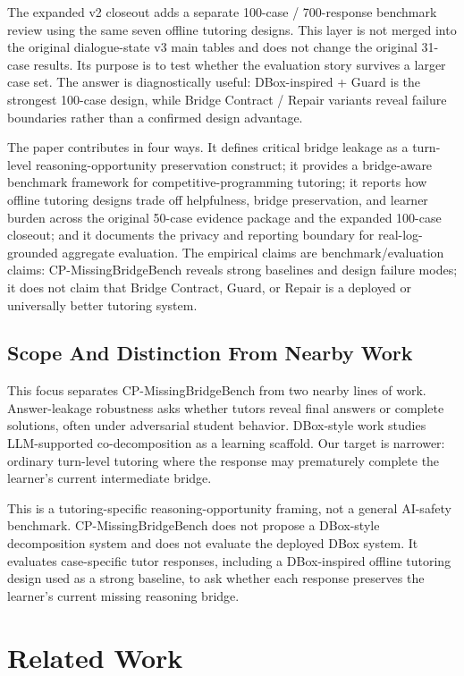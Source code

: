\documentclass[11pt]{article}
\begin{document}
The expanded v2 closeout adds a separate 100-case / 700-response benchmark review using the same seven offline tutoring designs. This layer is not merged into the original dialogue-state v3 main tables and does not change the original 31-case results. Its purpose is to test whether the evaluation story survives a larger case set. The answer is diagnostically useful: DBox-inspired + Guard is the strongest 100-case design, while Bridge Contract / Repair variants reveal failure boundaries rather than a confirmed design advantage.

The paper contributes in four ways. It defines critical bridge leakage as a turn-level reasoning-opportunity preservation construct; it provides a bridge-aware benchmark framework for competitive-programming tutoring; it reports how offline tutoring designs trade off helpfulness, bridge preservation, and learner burden across the original 50-case evidence package and the expanded 100-case closeout; and it documents the privacy and reporting boundary for real-log-grounded aggregate evaluation. The empirical claims are benchmark/evaluation claims: CP-MissingBridgeBench reveals strong baselines and design failure modes; it does not claim that Bridge Contract, Guard, or Repair is a deployed or universally better tutoring system.

\subsection{Scope And Distinction From Nearby Work}

This focus separates CP-MissingBridgeBench from two nearby lines of work. Answer-leakage robustness asks whether tutors reveal final answers or complete solutions, often under adversarial student behavior. DBox-style work studies LLM-supported co-decomposition as a learning scaffold. Our target is narrower: ordinary turn-level tutoring where the response may prematurely complete the learner's current intermediate bridge.

This is a tutoring-specific reasoning-opportunity framing, not a general AI-safety benchmark. CP-MissingBridgeBench does not propose a DBox-style decomposition system and does not evaluate the deployed DBox system. It evaluates case-specific tutor responses, including a DBox-inspired offline tutoring design used as a strong baseline, to ask whether each response preserves the learner's current missing reasoning bridge.

\section{Related Work}
\end{document}
